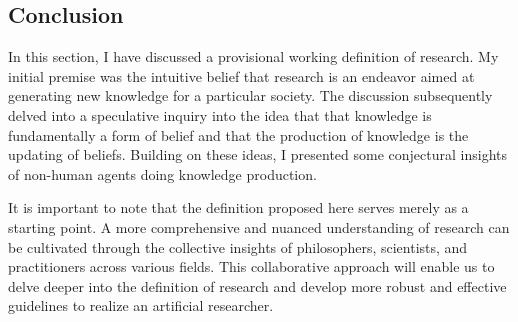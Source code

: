 

\subsection{Conclusion}
In this section, I have discussed a provisional working definition of research. My initial premise was the intuitive belief that research is an endeavor aimed at generating new knowledge for a particular society. The discussion subsequently delved into a speculative inquiry into the idea that that knowledge is fundamentally a form of belief and that the production of knowledge is the updating of beliefs. Building on these ideas, I presented some conjectural insights of non-human agents doing knowledge production.

It is important to note that the definition proposed here serves merely as a starting point. A more comprehensive and nuanced understanding of research can be cultivated through the collective insights of philosophers, scientists, and practitioners across various fields. This collaborative approach will enable us to delve deeper into the definition of research and develop more robust and effective guidelines to realize an artificial researcher.

